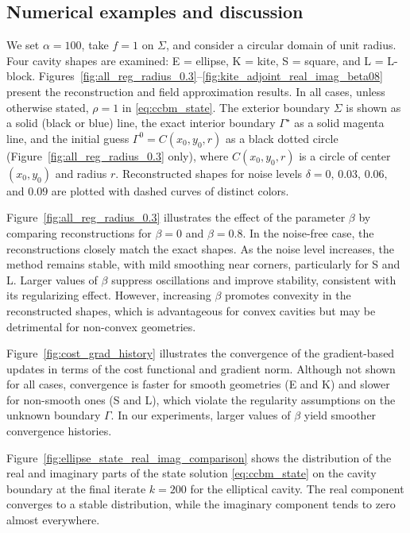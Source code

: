 \documentclass[a4paper,11pt]{article}
\begin{document}
\subsection{Numerical examples and discussion}
\label{subsec:numerical_examples} 
%
We set $\alpha = 100$, take $f = 1$ on $\varSigma$, and consider a circular domain of unit radius. 
Four cavity shapes are examined: E = ellipse, K = kite, S = square, and L = L-block. Figures~\ref{fig:all_reg_radius_0.3}--\ref{fig:kite_adjoint_real_imag_beta08} present the reconstruction and field approximation results. 
In all cases, unless otherwise stated, $\rho = 1$ in \eqref{eq:ccbm_state}.
The exterior boundary $\varSigma$ is shown as a solid (black or blue) line, the exact interior boundary $\varGamma^{\star}$ as a solid magenta line, and the initial guess $\varGamma^{0}=C(x_0,y_0,r)$ as a black dotted circle (Figure~\ref{fig:all_reg_radius_0.3} only), where $C(x_0,y_0,r)$ is a circle of center $(x_0,y_0)$ and radius $r$.
Reconstructed shapes for noise levels $\delta = 0,\,0.03,\,0.06,$ and $0.09$ are plotted with dashed curves of distinct colors. 


Figure~\ref{fig:all_reg_radius_0.3} illustrates the effect of the parameter $\beta$ by comparing reconstructions for $\beta = 0$ and $\beta = 0.8$.
In the noise-free case, the reconstructions closely match the exact shapes. As the noise level increases, the method remains stable, with mild smoothing near corners, particularly for S and L. 
Larger values of $\beta$ suppress oscillations and improve stability, consistent with its regularizing effect. 
However, increasing $\beta$ promotes convexity in the reconstructed shapes, which is advantageous for convex cavities but may be detrimental for non-convex geometries.

Figure~\ref{fig:cost_grad_history} illustrates the convergence of the gradient-based updates in terms of the cost functional and gradient norm. 
Although not shown for all cases, convergence is faster for smooth geometries (E and K) and slower for non-smooth ones (S and L), which violate the regularity assumptions on the unknown boundary $\varGamma$. 
In our experiments, larger values of $\beta$ yield smoother convergence histories.

Figure~\ref{fig:ellipse_state_real_imag_comparison} shows the distribution of the real and imaginary parts of the state solution \eqref{eq:ccbm_state} on the cavity boundary at the final iterate $k=200$ for the elliptical cavity. 
The real component converges to a stable distribution, while the imaginary component tends to zero almost everywhere.
\end{document}
